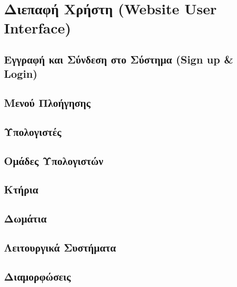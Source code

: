 \chapter{Διεπαφή Χρήστη (Website User Interface)}

\section{Εγγραφή και Σύνδεση στο Σύστημα (Sign up \& Login)}

\section{Μενού Πλοήγησης}

\section{Υπολογιστές}

\section{Ομάδες Υπολογιστών}

\section{Κτήρια}

\section{Δωμάτια}

\section{Λειτουργικά Συστήματα}

\section{Διαμορφώσεις}
